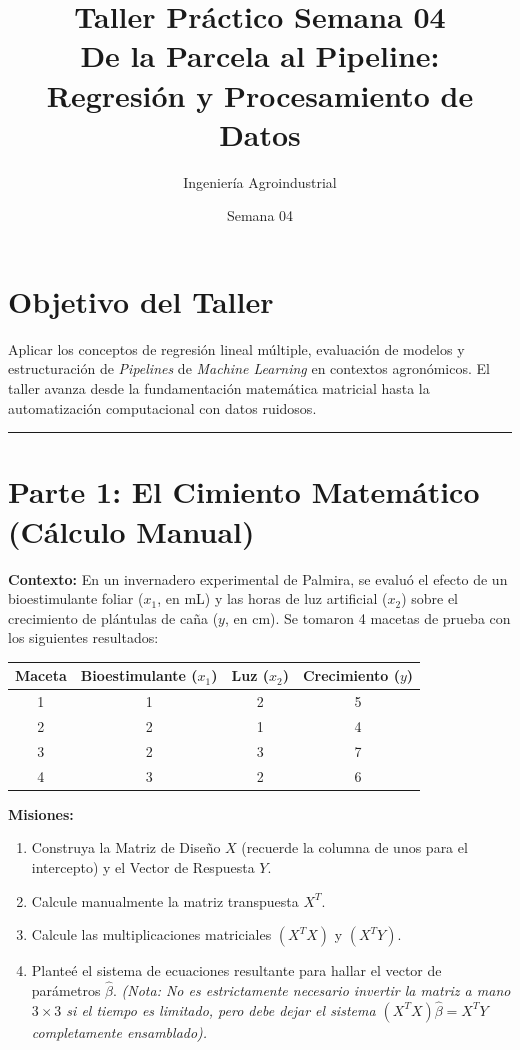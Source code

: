 \documentclass[12pt,a4paper]{article}
\title{\textbf{Taller Práctico Semana 04}\\ \Large De la Parcela al Pipeline: Regresión y Procesamiento de Datos}
\author{Ingeniería Agroindustrial}
\date{Semana 04}
\begin{document}
\sloppy %

\maketitle

\section*{Objetivo del Taller}
Aplicar los conceptos de regresión lineal múltiple, evaluación de modelos y estructuración de \textit{Pipelines} de \textit{Machine Learning} en contextos agronómicos. El taller avanza desde la fundamentación matemática matricial hasta la automatización computacional con datos ruidosos.

\vspace{0.5cm}
\noindent\rule{\textwidth}{0.4pt} %
\vspace{0.5cm}

\section{Parte 1: El Cimiento Matemático (Cálculo Manual)}

\textbf{Contexto:} En un invernadero experimental de Palmira, se evaluó el efecto de un bioestimulante foliar ($x_1$, en mL) y las horas de luz artificial ($x_2$) sobre el crecimiento de plántulas de caña ($y$, en cm). Se tomaron 4 macetas de prueba con los siguientes resultados:

\begin{table}[h]
\centering
\begin{tabular}{cccc}
\toprule
\textbf{Maceta} & \textbf{Bioestimulante ($x_1$)} & \textbf{Luz ($x_2$)} & \textbf{Crecimiento ($y$)} \\
\midrule
1 & 1 & 2 & 5 \\
2 & 2 & 1 & 4 \\
3 & 2 & 3 & 7 \\
4 & 3 & 2 & 6 \\
\bottomrule
\end{tabular}
\end{table}

\textbf{Misiones:}
\begin{enumerate}[label=\alph*)]
    \item Construya la Matriz de Diseño $X$ (recuerde la columna de unos para el intercepto) y el Vector de Respuesta $Y$.
    \item Calcule manualmente la matriz transpuesta $X^T$.
    \item Calcule las multiplicaciones matriciales $(X^T X)$ y $(X^T Y)$.
    \item Planteé el sistema de ecuaciones resultante para hallar el vector de parámetros $\hat{\beta}$. \textit{(Nota: No es estrictamente necesario invertir la matriz a mano $3 \times 3$ si el tiempo es limitado, pero debe dejar el sistema $(X^T X)\hat{\beta} = X^T Y$ completamente ensamblado).}
\end{enumerate}
\end{document}
